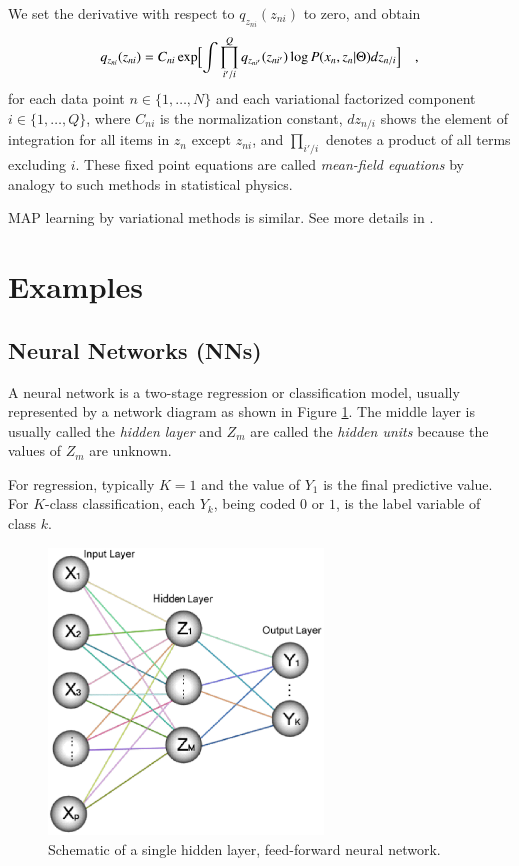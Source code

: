 \documentclass{article}
\begin{document}
We set the derivative with respect to $q_{z_{ni}}(z_{ni})$ to zero, and obtain
\begin{equation}
q_{z_{ni}}(z_{ni}) =
C_{ni} \exp \Bigl[ \int \prod_{i'/i}^Q q_{z_{ni'}}(z_{ni'}) \log P(x_n,z_n|\Theta) dz_{n/i} \Bigr] \quad ,
\end{equation}
for each data point $n\in\{1,\ldots,N\}$ and each variational factorized component
$i\in\{1,\ldots,Q\}$, where $C_{ni}$ is the normalization constant,
$dz_{n/i}$ shows the element of integration for all items in $z_n$ except $z_{ni}$,
and $\prod_{i'/i}$ denotes a product of all terms excluding $i$.
These fixed point equations are called \textit{mean-field equations}
by analogy to such methods in statistical physics.

MAP learning by variational methods is similar.
See more details in \cite{Beal}.





\section{Examples}
\subsection{Neural Networks (NNs) \cite{Hastie}}
A neural network is a two-stage regression or classification model,
usually represented by a network diagram as shown in Figure \ref{neural}.
The middle layer is usually called the \textit{hidden layer} and
$Z_m$ are called the \textit{hidden units} because
the values of $Z_m$ are unknown.

For regression, typically $K=1$ and the value of $Y_1$ is the final predictive value.
For $K$-class classification, each $Y_k$, being coded $0$ or $1$, is the label variable
of class $k$.
\begin{figure}[h]
\centering
\includegraphics[trim=0 15 0 0,width=0.65\textwidth]{neural_network3.eps}
\caption{Schematic of a single hidden layer, feed-forward neural network.}\label{neural}
\end{figure}
\end{document}
